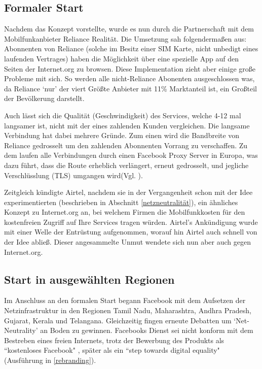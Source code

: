 \documentclass{article}
\begin{document}
\subsection{Formaler Start} \label{formal}

Nachdem \textcite{HumanRight} das Konzept vorstellte, wurde es nun durch die Partnerschaft mit dem Mobilfunkanbieter Reliance Realität.
Die Umsetzung sah folgendermaßen aus: Abonnenten von Reliance (solche im Besitz einer SIM Karte, nicht unbedigt eines laufenden Vertrages) haben die Möglichkeit über eine spezielle App auf den Seiten der Internet.org zu browsen.
Diese Implementation zieht aber einige große Probleme mit sich. So werden alle nicht-Reliance Abonenten ausgeschlossen was, da Reliance `nur' der viert Größte Anbieter mit 11\% Marktanteil\autocite{mobileSubscribers} ist, ein Großteil der Bevölkerung darstellt.

Auch lässt sich die Qualität (Geschwindigkeit) des Services, welche 4-12 mal langsamer ist, nicht mit der eines zahlenden Kunden vergleichen.
Die langsame Verbindung hat dabei mehrere Gründe. Zum einen wird die Bandbreite von Reliance gedrosselt um den zahlenden Abonnenten Vorrang zu verschaffen. Zu dem laufen alle Verbindungen durch einen Facebook Proxy Server in Europa, was dazu führt, dass die Route erheblich verlängert, erneut gedrosselt, und jegliche Verschlüsslung (TLS) umgangen wird(Vgl. \cite{walledGarden}).

\medskip

Zeitgleich kündigte Airtel, nachdem sie in der Vergangenheit schon mit der Idee experimentierten (beschrieben in Abschnitt \ref{netzneutralität}), ein ähnliches Konzept zu Internet.org an, bei welchem Firmen die Mobilfunkkosten für den kostenfreien Zugriff auf Ihre Services tragen würden.
Airtel's Ankündigung wurde mit einer Welle der Entrüstung aufgenommen, worauf hin Airtel auch schnell von der Idee abließ.
Dieser angesammelte Unmut wendete sich nun aber auch gegen Internet.org.

\subsection{Start in ausgewählten Regionen}

Im Anschluss an den formalen Start begann Facebook mit dem Aufsetzen der Netzinfrastruktur in den Regionen Tamil Nadu, Maharashtra, Andhra Pradesh, Gujarat, Kerala und Telangana.
Gleichzeitig fingen erneute Debatten um `Net-Neutrality' an Boden zu gewinnen.
Facebooks Dienst sei nicht konform mit dem Bestreben eines freien Internets, trotz der Bewerbung des Produkts als ``kostenloses Facebook" \parencite[3]{prasad2017}, später als ein ``step towards digital equality" (Ausführung in \ref{rebranding}).
\medskip
\end{document}
